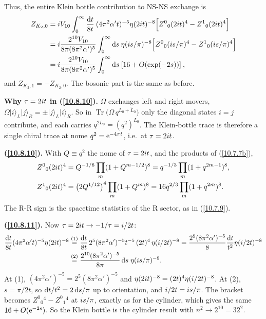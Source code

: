 	Thus, the entire Klein bottle contribution to NS-NS exchange is
	\begin{align}
		Z_{K_{2},0} &= i V_{10} \int_{0}^{\infty}\frac{\mathrm{d} t}{8t}\: (4\pi^{2}\alpha^{\prime}t)^{-5} \eta(2i t)^{-8}
		\Bigl[ Z^{0}{}_{0}(2i t)^{4}-Z^{1}{}_{0}(2i t)^{4}\Bigr] \nonumber \\
		&= i \frac{2^{10}V_{10}}{8\pi (8\pi^{2}\alpha^{\prime})^{5}}\int^{\infty}_{0}\mathrm{d} s \: 
		\eta(i s/\pi)^{-8} \Bigl[ Z^{0}{}_{0}(i s/\pi)^{4}-Z^{1}{}_{0}(i s/\pi)^{4} \Bigr] \nonumber \\
		&= i \frac{2^{10}V_{10}}{8\pi (8\pi^{2}\alpha^{\prime})^{5}}\int^{\infty}_{0}\mathrm{d} s \: 
		[16 + O(\exp(-2s))] \:, \label{10.8.11}
	\end{align}
	and $Z_{K_{2},1}=-Z_{K_{2},0}$. The bosonic part is the same as before.
	\begin{tcolorbox}[breakable]
		\begin{remark}
			\textbf{Why $\tau=2i t$ in (\ref{10.8.10}).} $\Omega$ exchanges left and right movers, $\Omega\lvert i\rangle_L\lvert j\rangle_R=\pm\lvert j\rangle_L\lvert i\rangle_R$. So in $\operatorname{Tr}\bigl(\Omega\,q^{L_0+\tilde L_0}\bigr)$ only the diagonal states $i=j$ contribute, and each carries $q^{2L_0}=(q^{2})^{L_0}$. The Klein-bottle trace is therefore a single chiral trace at nome $q^{2}=\mathrm{e}^{-4\pi t}$, i.e.\ at $\tau=2i t$.

			\textbf{(\ref{10.8.10}).} With $Q\equiv q^{2}$ the nome of $\tau=2i t$, and the products of (\ref{10.7.7b}),
			\begin{align*}
				Z^0{}_0(2i t)^{4}&=Q^{-1/6}\prod_m(1+Q^{m-1/2})^{8}=q^{-1/3}\prod_m(1+q^{2m-1})^{8},\\
				Z^1{}_0(2i t)^{4}&=\bigl(2Q^{1/12}\bigr)^{4}\prod_m(1+Q^{m})^{8}=16q^{2/3}\prod_m(1+q^{2m})^{8} .
			\end{align*}
			The R-R sign is the spacetime statistics of the R sector, as in (\ref{10.7.9}).

			\textbf{(\ref{10.8.11}).} Now $\tau=2i t\to-1/\tau=i/2t$:
			\begin{align*}
				\frac{\mathrm{d} t}{8t}(4\pi^{2}\alpha't)^{-5}\eta(2i t)^{-8}
				&\overset{(1)}{=}\frac{\mathrm{d} t}{8t}\,2^{5}(8\pi^{2}\alpha')^{-5}t^{-5}\,(2t)^{4}\,\eta(i/2t)^{-8}
				=\frac{2^{9}(8\pi^{2}\alpha')^{-5}}{8}\frac{\mathrm{d} t}{t^{2}}\eta(i/2t)^{-8}\\
				&\overset{(2)}{=}\frac{2^{10}(8\pi^{2}\alpha')^{-5}}{8\pi}\,\mathrm{d} s\;\eta(i s/\pi)^{-8} .
			\end{align*}
			At (1), $(4\pi^{2}\alpha')^{-5}=2^{5}(8\pi^{2}\alpha')^{-5}$ and $\eta(2i t)^{-8}=(2t)^{4}\eta(i/2t)^{-8}$. At (2), $s=\pi/2t$, so $\mathrm{d} t/t^{2}=2\,\mathrm{d} s/\pi$ up to orientation, and $i/2t=i s/\pi$. The bracket becomes $Z^0{}_0{}^4-Z^0{}_1{}^4$ at $i s/\pi$, exactly as for the cylinder, which gives the same $16+O(\mathrm{e}^{-2s})$. So the Klein bottle is the cylinder result with $n^{2}\to2^{10}=32^{2}$.
		\end{remark}
	\end{tcolorbox}
	
